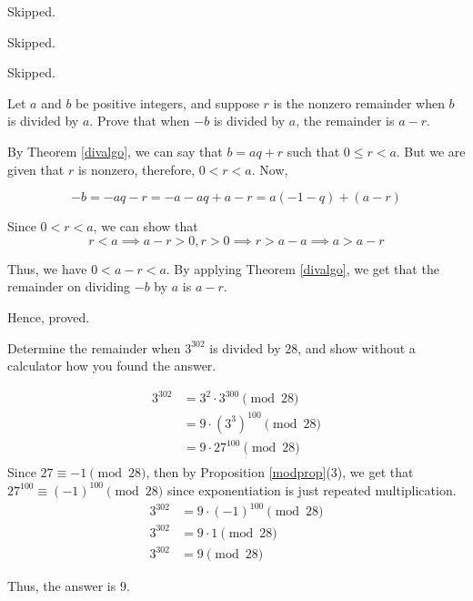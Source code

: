 \begin{problem}Skipped.\end{problem}
\begin{problem}Skipped.\end{problem}
\begin{problem}Skipped.\end{problem}

\begin{problem}
	Let $a$ and $b$ be positive integers, and suppose $r$ is the nonzero remainder when $b$ is divided by $a$. Prove that when $-b$ is divided by $a$, the remainder is $a-r$.
\end{problem}

\begin{solution}
	By Theorem \ref{divalgo}, we can say that $b = aq + r$ such that $0 \leq r < a$.
	But we are given that $r$ is nonzero, therefore, $0 < r < a$. Now,

	$$-b = -aq-r = -a-aq+a-r = a(-1-q) + (a-r)$$
	
	Since $0 < r < a$, we can show that 
	$$r < a \implies a - r > 0, r > 0 \implies r > a-a \implies a > a-r$$

	Thus, we have $0 < a-r < a$. By applying Theorem \ref{divalgo}, we get that the remainder on dividing $-b$ by $a$ is $a-r$.

	Hence, proved.

\end{solution}

\begin{problem}
	Determine the remainder when $3^302$ is divided by $28$, and show without a calculator how you found the answer.
\end{problem}

\begin{solution}
	\begin{align}
		3^{302} &= 3^{2} \cdot 3^{300} \pmod{28} \\
						&= 9 \cdot (3^3)^{100}  \pmod{28} \\
						&= 9 \cdot 27^{100} \pmod{28} \\
	\end{align}
	Since $27 \equiv -1 \pmod{28}$, then by Proposition \ref{modprop}(3), we get that $27^{100} \equiv (-1)^{100} \pmod{28}$ since exponentiation is just repeated multiplication.
	\begin{align}
		3^{302} &= 9 \cdot (-1)^{100} \pmod{28} \\
		3^{302} &= 9 \cdot 1 \pmod{28} \\
		3^{302} &= 9 \pmod{28}
	\end{align}

	Thus, the answer is $9$.

\end{solution}
